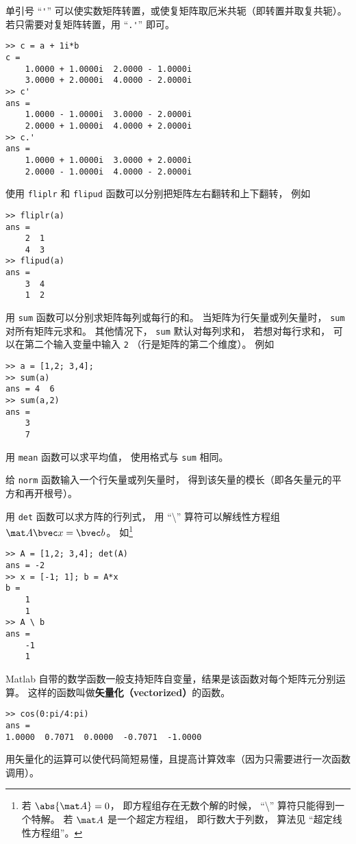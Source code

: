单引号 “\verb|'|” 可以使实数矩阵转置，或使复矩阵取厄米共轭（即转置并取复共轭）。若只需要对复矩阵转置，用 “\verb|.'|” 即可。
\begin{lstlisting}[language=matlabC]
>> c = a + 1i*b
c =
    1.0000 + 1.0000i  2.0000 - 1.0000i
    3.0000 + 2.0000i  4.0000 - 2.0000i
>> c'
ans =
    1.0000 - 1.0000i  3.0000 - 2.0000i
    2.0000 + 1.0000i  4.0000 + 2.0000i
>> c.'
ans =
    1.0000 + 1.0000i  3.0000 + 2.0000i
    2.0000 - 1.0000i  4.0000 - 2.0000i
\end{lstlisting}
使用 \verb|fliplr| 和 \verb|flipud| 函数可以分别把矩阵左右翻转和上下翻转， 例如
\begin{lstlisting}[language=matlabC]
>> fliplr(a)
ans =
    2  1
    4  3
>> flipud(a)
ans =
    3  4
    1  2
\end{lstlisting}

用 \verb|sum| 函数可以分别求矩阵每列或每行的和。 当矩阵为行矢量或列矢量时， \verb|sum| 对所有矩阵元求和。 其他情况下， \verb|sum| 默认对每列求和， 若想对每行求和， 可以在第二个输入变量中输入 \verb|2| （行是矩阵的第二个维度）。 例如
\begin{lstlisting}[language=matlabC]
>> a = [1,2; 3,4];
>> sum(a)
ans = 4  6
>> sum(a,2)
ans =
    3
    7
\end{lstlisting}
用 \verb|mean| 函数可以求平均值， 使用格式与 \verb|sum| 相同。

给 \verb|norm| 函数输入一个行矢量或列矢量时， 得到该矢量的模长（即各矢量元的平方和再开根号）。 

用 \verb|det| 函数可以求方阵的行列式， 用 “\textbackslash” 算符可以解线性方程组%
 $\mat A \bvec x = \bvec b$。 如\footnote{若 $\abs{\mat A} = 0$， 即方程组存在无数个解的时候， “\textbackslash” 算符只能得到一个特解。 若 $\mat A$ 是一个超定方程组， 即行数大于列数， 算法见 “超定线性方程组”。}
\begin{lstlisting}[language=matlabC]
>> A = [1,2; 3,4]; det(A)
ans = -2
>> x = [-1; 1]; b = A*x
b =
    1
    1
>> A \ b
ans =
    -1
    1
\end{lstlisting}

Matlab 自带的数学函数一般支持矩阵自变量，结果是该函数对每个矩阵元分别运算。 这样的函数叫做\textbf{矢量化（vectorized）}的函数。
\begin{lstlisting}[language=matlabC]
>> cos(0:pi/4:pi)
ans =
1.0000  0.7071  0.0000  -0.7071  -1.0000
\end{lstlisting}
用矢量化的运算可以使代码简短易懂，且提高计算效率（因为只需要进行一次函数调用）。

